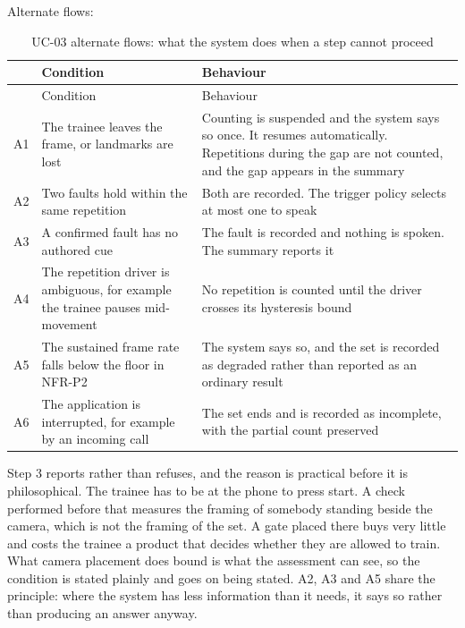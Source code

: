 Alternate flows:

{\small
\setlength{\LTpre}{6pt}\setlength{\LTpost}{8pt}
\begin{longtable}{>{\raggedright\arraybackslash}p{}>{\raggedright\arraybackslash}p{}>{\raggedright\arraybackslash}p{}}
\caption{UC-03 alternate flows: what the system does when a step cannot proceed}\\
\toprule
 & Condition & Behaviour \\
\midrule
\endfirsthead
\toprule
 & Condition & Behaviour \\
\midrule
\endhead
\bottomrule
\endfoot
\bottomrule
\endlastfoot
A1 & The trainee leaves the frame, or landmarks are lost & Counting is suspended and the system says so once. It resumes automatically. Repetitions during the gap are not counted, and the gap appears in the summary \\
A2 & Two faults hold within the same repetition & Both are recorded. The trigger policy selects at most one to speak \\
A3 & A confirmed fault has no authored cue & The fault is recorded and nothing is spoken. The summary reports it \\
A4 & The repetition driver is ambiguous, for example the trainee pauses mid-movement & No repetition is counted until the driver crosses its hysteresis bound \\
A5 & The sustained frame rate falls below the floor in NFR-P2 & The system says so, and the set is recorded as degraded rather than reported as an ordinary result \\
A6 & The application is interrupted, for example by an incoming call & The set ends and is recorded as incomplete, with the partial count preserved \\
\end{longtable}
}

Step 3 reports rather than refuses, and the reason is practical before it is philosophical. The trainee has to be at the phone to press start. A check performed before that measures the framing of somebody standing beside the camera, which is not the framing of the set. A gate placed there buys very little and costs the trainee a product that decides whether they are allowed to train. What camera placement does bound is what the assessment can see, so the condition is stated plainly and goes on being stated. A2, A3 and A5 share the principle: where the system has less information than it needs, it says so rather than producing an answer anyway.

